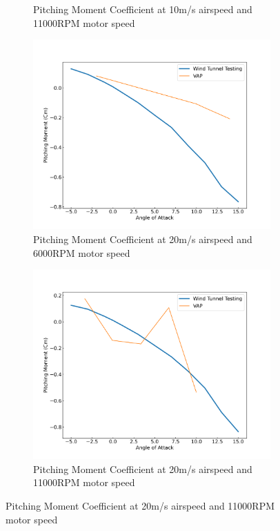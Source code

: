 \begin{figure}[H]
\begin{subfigure}[b]{0.467\textwidth}
        \caption{Pitching Moment Coefficient at 10m/s airspeed and 11000RPM motor speed}
        \label{fig:VAP_Cm_10ms_11000}
    \end{subfigure}
    \begin{subfigure}[b]{0.467\textwidth}
        \centering
        \includegraphics[width=\textwidth]{05_Results/VAP/tractor/Cm/20ms_6000RPM_Cm.png}
        \caption{Pitching Moment Coefficient at 20m/s airspeed and 6000RPM motor speed}
        \label{fig:VAP_Cm_20ms_6000}
    \end{subfigure}
    \begin{subfigure}[b]{0.467\textwidth}
        \centering
        \includegraphics[width=\textwidth]{05_Results/VAP/tractor/Cm/20ms_11000RPM_Cm.png}
        \caption{Pitching Moment Coefficient at 20m/s airspeed and 11000RPM motor speed}
        \label{fig:VAP_Cm_20ms_11000}
    \end{subfigure}
\end{figure}


